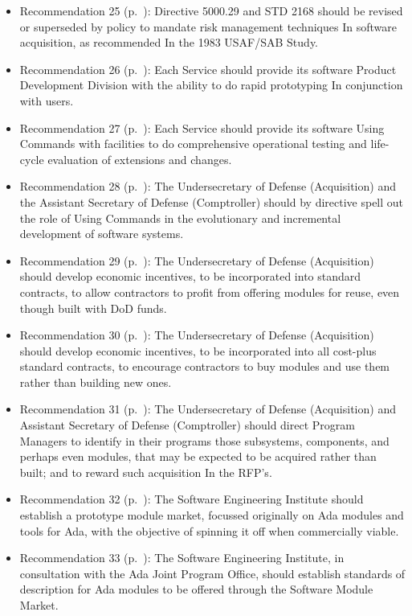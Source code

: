 \documentclass[11pt,final]{article}
\begin{document}
\begin{itemize}
    \item Recommendation 25 (p.~\pageref{rec:25}): Directive 5000.29 and STD 2168 should be revised or superseded by policy to mandate risk management techniques In software acquisition, as recommended In the 1983 USAF/SAB Study.
    \item Recommendation 26 (p.~\pageref{rec:26}): Each Service should provide its software Product Development Division with the ability to do rapid prototyping In conjunction with users.
    \item Recommendation 27 (p.~\pageref{rec:27}): Each Service should provide its software Using Commands with facilities to do comprehensive operational testing and life-cycle evaluation of extensions and changes.
    \item Recommendation 28 (p.~\pageref{rec:28}): The Undersecretary of Defense (Acquisition) and the Assistant Secretary of Defense (Comptroller) should by directive spell out the role of Using Commands in the evolutionary and incremental development of software systems.
    \item Recommendation 29 (p.~\pageref{rec:29}): The Undersecretary of Defense (Acquisition) should develop economic incentives, to be incorporated into standard contracts, to allow contractors to profit from offering modules for reuse, even though built with DoD funds.
    \item Recommendation 30 (p.~\pageref{rec:30}): The Undersecretary of Defense (Acquisition) should develop economic incentives, to be incorporated into all cost-plus standard contracts, to encourage contractors to buy modules and use them rather than building new ones.
    \item Recommendation 31 (p.~\pageref{rec:31}): The Undersecretary of Defense (Acquisition) and Assistant Secretary of Defense (Comptroller) should direct Program Managers to identify in their programs those subsystems, components, and perhaps even modules, that may be expected to be acquired rather than built; and to reward such acquisition In the RFP’s.
    \item Recommendation 32 (p.~\pageref{rec:32}): The Software Engineering Institute should establish a prototype module market, focussed originally on Ada modules and tools for Ada, with the objective of spinning it off when commercially viable.
    \item Recommendation 33 (p.~\pageref{rec:33}): The Software Engineering Institute, in consultation with the Ada Joint Program Office, should establish standards of description for Ada modules to be offered through the Software Module Market.

\end{itemize}
\end{document}
